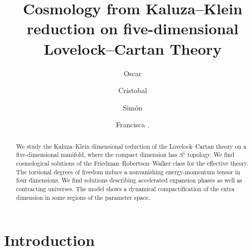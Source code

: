 \documentclass[aps,prd,12pt,superscriptaddress,showpacs,showkeys,longbibliography,reprint,nofootinbib]{revtex4-1}
\begin{document}
\title{Cosmology from  Kaluza--Klein reduction on five-dimensional Lovelock--Cartan Theory}

\author{Oscar }

\author{Cristobal }

\author{Sim\'on }

\author{Francisca .}

\begin{abstract}
  We study the Kaluza--Klein dimensional reduction of the Lovelock--Cartan theory on a five-dimensional manifold, where the compact dimension has $S^1$ topology. We find cosmological solutions of the Friedman--Robertson--Walker class for the effective theory.
  The torsional degrees of freedom induce a nonvanishing energy-momentum tensor in four dimensions. We find solutions describing accelerated expansion phases as well as contracting universes. The model shows a dynamical compactification of the extra dimension in some regions of the parameter space. 
\end{abstract}



\maketitle

\section{Introduction}
\end{document}

